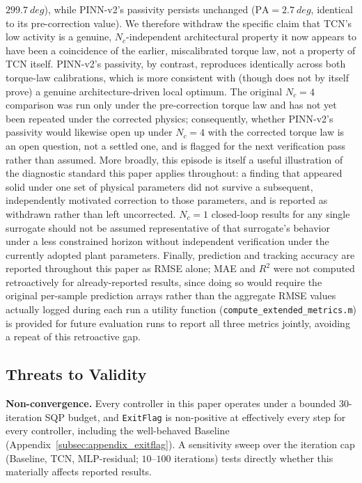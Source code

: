 $\SI{299.7}{deg}$), while PINN-v2's passivity persists unchanged
($\text{PA}=\SI{2.7}{deg}$, identical to its pre-correction value). We
therefore withdraw the specific claim that TCN's low activity is a
genuine, $N_c$-independent architectural property  it now appears to
have been a coincidence of the earlier, miscalibrated torque law, not a
property of TCN itself. PINN-v2's passivity, by contrast, reproduces
identically across both torque-law calibrations, which is more
consistent with (though does not by itself prove) a genuine
architecture-driven local optimum. The original $N_c=4$ comparison was
run only under the pre-correction torque law and has not yet been
repeated under the corrected physics; consequently, whether PINN-v2's
passivity would likewise open up under $N_c=4$ with the corrected
torque law is an open question, not a settled one, and is flagged for
the next verification pass rather than assumed. More broadly, this
episode is itself a useful illustration of the diagnostic standard this
paper applies throughout: a finding that appeared solid under one set of
physical parameters did not survive a subsequent, independently
motivated correction to those parameters, and is reported as withdrawn
rather than left uncorrected. $N_c=1$ closed-loop results for any single
surrogate should not be assumed representative of that surrogate's
behavior under a less constrained horizon without independent
verification under the currently adopted plant parameters. Finally, prediction and tracking accuracy
are reported throughout this paper as RMSE alone; MAE and $R^2$ were
not computed retroactively for already-reported results, since doing
so would require the original per-sample prediction arrays rather than
the aggregate RMSE values actually logged during each run  a
utility function (\texttt{compute\_extended\_metrics.m}) is provided
for future evaluation runs to report all three metrics jointly,
avoiding a repeat of this retroactive gap.

\subsection{Threats to Validity}
\label{subsec:threats_to_validity}

\textbf{Non-convergence.} Every controller in this paper operates under
a bounded $30$-iteration SQP budget, and \texttt{ExitFlag} is
non-positive at effectively every step for every controller, including
the well-behaved Baseline (Appendix~\ref{subsec:appendix_exitflag}). A
sensitivity sweep over the iteration cap (Baseline, TCN, MLP-residual;
$10$--$100$ iterations) tests directly whether this materially affects
reported results.


